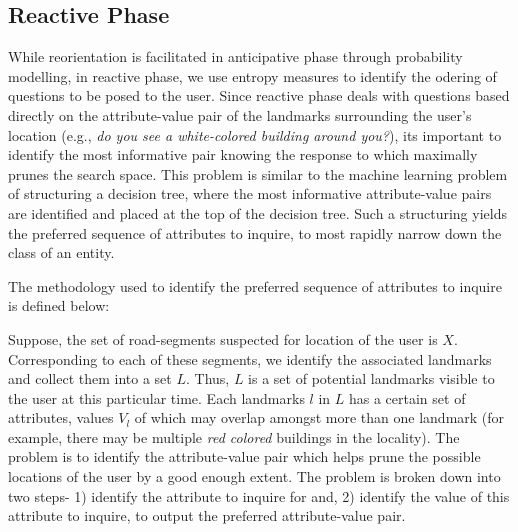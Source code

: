 \documentclass{iitkthesis}
\begin{document}
\iffalse
$$
\begin{bmatrix}
P(X_2=R_1/X_1=R_1,I=R_1) & P(X_2=R_1/X_1=R_1,I=R_1) & \cdots & P(X_2=R_1/X_1=R_1,I=R_1)\\
P(X_2=R_1/X_1=R_1,I=R_1) & P(X_2=R_1/X_1=R_1,I=R_1) & \cdots & P(X_2=R_1/X_1=R_1,I=R_1)\\
\vdots& \vdots& \cdots& \vdots\\ 
P(X_2=R_1/X_1=R_1,I=R_1) & P(X_2=R_1/X_1=R_1,I=R_1) & \cdots &P(X_2=R_1/X_1=R_1,I=R_1)\\
\end{bmatrix}
$$
\fi
\subsection{Reactive Phase}
While reorientation is facilitated in anticipative phase through probability modelling, in reactive phase, we use entropy measures to identify the odering of questions to be posed to the user. Since reactive phase deals with questions based directly on the attribute-value pair of the landmarks surrounding the user's location (e.g., \textit{do you see a white-colored building around you?}), its important to identify the most informative pair knowing the response to which maximally prunes the search space. This problem is similar to the machine learning problem of structuring a decision tree, where the most informative attribute-value pairs are identified and placed at the top of the decision tree. Such a structuring yields the preferred sequence of attributes to inquire, to most rapidly narrow down the class of an entity. 

The methodology used to identify the preferred sequence of attributes to inquire is defined below:

Suppose, the set of road-segments suspected for location of the user is $X$. Corresponding to each of these segments, we identify the associated landmarks and collect them into a set $L$. Thus, $L$ is a set of potential landmarks visible to the user at this particular time. Each landmarks $l$ in $L$ has a certain set of attributes, values $V_{l}$ of which may overlap amongst more than one landmark (for example, there may be multiple \textit{red colored} buildings in the locality). The problem is to identify the attribute-value pair which helps prune the possible locations of the user by a good enough extent. The problem is broken down into two steps- 1) identify the attribute to inquire for and, 2) identify the value of this attribute to inquire, to output the preferred attribute-value pair. 
\end{document}
